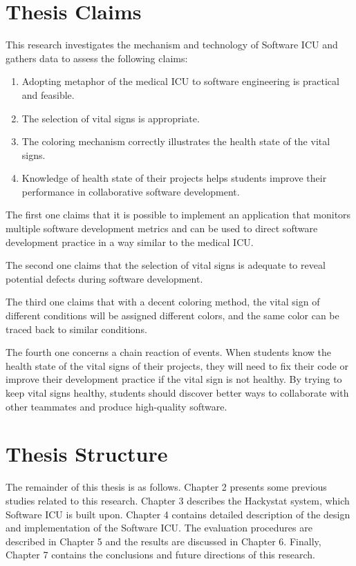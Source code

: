 \section{Thesis Claims}
This research investigates the mechanism and technology of Software ICU and gathers data to assess the following claims: 
\begin{enumerate}
\item Adopting metaphor of the medical ICU to software engineering is practical and feasible.
\item The selection of vital signs is appropriate.
\item The coloring mechanism correctly illustrates the health state of the vital signs.
\item Knowledge of health state of their projects helps students improve their performance in collaborative software development.
\end{enumerate}
The first one claims that it is possible to implement an application that monitors multiple software development metrics and can be used to direct software development practice in a way similar to the medical ICU.

The second one claims that the selection of vital signs is adequate to reveal potential defects during software development.

The third one claims that with a decent coloring method, the vital sign of different conditions will be assigned different colors, and the same color can be traced back to similar conditions.

The fourth one concerns a chain reaction of events. When students know the health state of the vital signs of their projects, they will need to fix their code or improve their development practice if the vital sign is not healthy. By trying to keep vital signs healthy, students should discover better ways to collaborate with other teammates and produce high-quality software.

\section{Thesis Structure}
The remainder of this thesis is as follows. Chapter 2 presents some previous studies related to this research. Chapter 3 describes the Hackystat system, which Software ICU is built upon. Chapter 4 contains detailed description of the design and implementation of the Software ICU. The evaluation procedures are described in Chapter 5 and the results are discussed in Chapter 6. Finally, Chapter 7 contains the conclusions and future directions of this research. 



